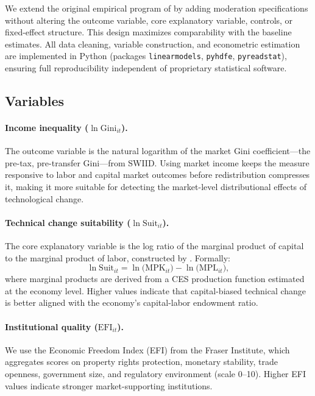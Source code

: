 \documentclass[12pt]{article}
\newcommand{\suit}{\mathrm{Suit}}
\newcommand{\gini}{\mathrm{Gini}}
\begin{document}
We extend the original empirical program of \citet{li2026prosperity}
by adding moderation specifications without altering the outcome
variable, core explanatory variable, controls, or
fixed-effect structure.
This design maximizes comparability with the baseline estimates.
All data cleaning, variable construction, and econometric estimation
are implemented in Python (packages \texttt{linearmodels},
\texttt{pyhdfe}, \texttt{pyreadstat}), ensuring full reproducibility
independent of proprietary statistical software.

\subsection{Variables}

\paragraph{Income inequality (\(\ln \gini_{it}\)).}
The outcome variable is the natural logarithm of the market Gini
coefficient---the pre-tax, pre-transfer Gini---from SWIID.
Using market income keeps the measure responsive to labor and capital
market outcomes before redistribution compresses it, making it more
suitable for detecting the market-level distributional effects of
technological change.

\paragraph{Technical change suitability (\(\ln \suit_{it}\)).}
The core explanatory variable is the log ratio of the marginal
product of capital to the marginal product of labor, constructed
by \citet{li2024suitability}.
Formally:
\begin{equation}
  \ln \suit_{it}
    = \ln \!\bigl(\mathrm{MPK}_{it}\bigr)
    - \ln \!\bigl(\mathrm{MPL}_{it}\bigr),
\end{equation}
where marginal products are derived from a CES production function
estimated at the economy level.
Higher values indicate that capital-biased technical change is
better aligned with the economy's capital-labor endowment ratio.

\paragraph{Institutional quality (\(\mathrm{EFI}_{it}\)).}
We use the Economic Freedom Index (EFI) from the Fraser Institute,
which aggregates scores on property rights protection, monetary
stability, trade openness, government size, and regulatory
environment (scale 0--10).
Higher EFI values indicate stronger market-supporting institutions.
\end{document}
